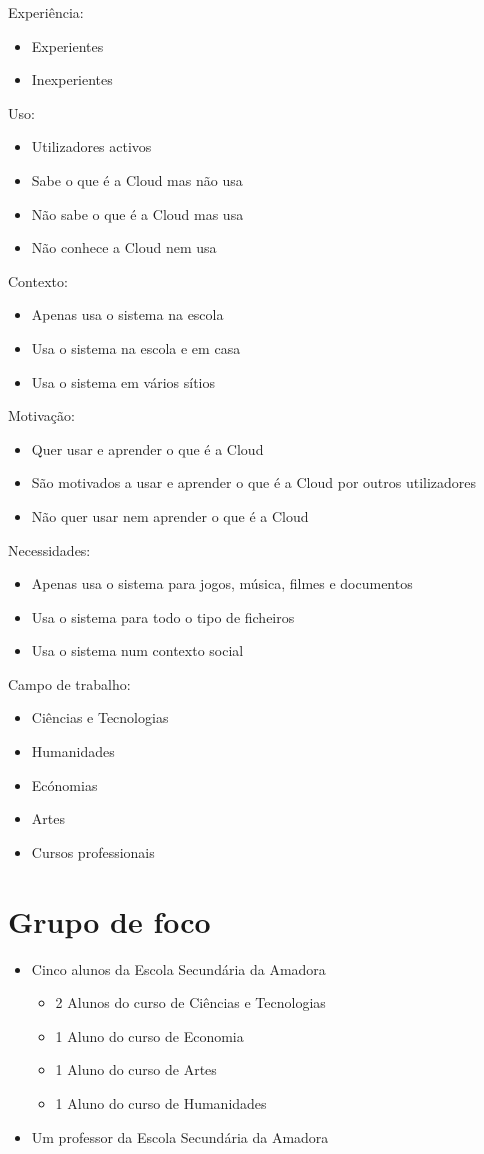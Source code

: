Experiência:
\begin{itemize}
	\item Experientes
	\item Inexperientes
\end{itemize}
Uso:
\begin{itemize}
	\item Utilizadores activos
	\item Sabe o que é a Cloud mas não usa
	\item Não sabe o que é a Cloud mas usa
	\item Não conhece a Cloud nem usa
\end{itemize}
Contexto:
\begin{itemize}
	\item Apenas usa o sistema na escola
	\item Usa o sistema na escola e em casa
	\item Usa o sistema em vários sítios
\end{itemize}
Motivação:
\begin{itemize}
	\item Quer usar e aprender o que é a Cloud
	\item São motivados a usar e aprender o que é a Cloud por outros utilizadores
	\item Não quer usar nem aprender o que é a Cloud
\end{itemize}
Necessidades:
\begin{itemize}
	\item Apenas usa o sistema para jogos, música, filmes e documentos
	\item Usa o sistema para todo o tipo de ficheiros
	\item Usa o sistema num contexto social
\end{itemize}
Campo de trabalho:
\begin{itemize}
	\item Ciências e Tecnologias
	\item Humanidades
	\item Ecónomias
	\item Artes
	\item Cursos professionais
\end{itemize}

\section{Grupo de foco}
\begin{itemize}
	\item Cinco alunos da Escola Secundária da Amadora
	\begin{itemize}
		\item 2 Alunos do curso de Ciências e Tecnologias
		\item 1 Aluno do curso de Economia
		\item 1 Aluno do curso de Artes
		\item 1 Aluno do curso de Humanidades
	\end{itemize}
	\item Um professor da Escola Secundária da Amadora
\end{itemize}
